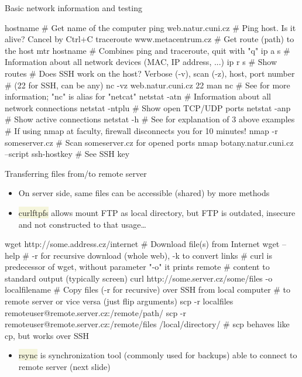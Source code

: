 \documentclass[compress, ucs, xelatex, 11pt, xcolor=svgnames, aspectratio=169,
	hyperref={
		bookmarks=true,
		unicode=true,
		colorlinks=true,
		pdftitle={Linux, command line and MetaCentrum},
		plainpages=false,
		pdfauthor={Vojtech Zeisek},
		pdfsubject={Course about use of Linux command line, writing shell scripts and using MetaCentrum of CESNET},
		pdfcreator={XeLaTeX},
		pdfkeywords={Linux, GNU, BASH, shell, command line, MetaCentrum},
		linkcolor=DarkRed, %
		anchorcolor=DarkBlue, %
		citecolor=Indigo, %
		filecolor=NavyBlue, %
		menucolor=DarkMagenta, %
		urlcolor=DarkBlue, %
		pdftex},
	url={hyphens, lowtilde} %
	]{beamer}
\renewcommand{\texttt}[1]{\colorbox{Beige}{{\ttfamily #1}}}
\begin{document}
\begin{frame}[fragile]{Basic network information and testing}
	\begin{bashcode}
    hostname # Get name of the computer
    ping web.natur.cuni.cz # Ping host. Is it alive? Cancel by Ctrl+C
    traceroute www.metacentrum.cz # Get route (path) to the host
    mtr hostname # Combines ping and traceroute, quit with "q"
    ip a s # Information about all network devices (MAC, IP address, ...)
    ip r s # Show routes
    # Does SSH work on the host? Verbose (-v), scan (-z), host, port number
    # (22 for SSH, can be any)
    nc -vz web.natur.cuni.cz 22
    man nc # See for more information; "nc" is alias for "netcat"
    netstat -atn # Information about all network connections
    netstat -ntplu # Show open TCP/UDP ports
    netstat -anp # Show active connections
    netstat -h # See for explanation of 3 above examples
    # If using nmap at faculty, firewall disconnects you for 10 minutes!
    nmap -r someserver.cz # Scan someserver.cz for opened ports
    nmap botany.natur.cuni.cz --script ssh-hostkey # See SSH key
	\end{bashcode}
\end{frame}

\begin{frame}[fragile]{Transferring files from/to remote server}
	\label{transfers}
	\begin{itemize}
		\item On server side, same files can be accessible (shared) by more methods
		\item \texttt{curlftpfs} allows mount FTP as local directory, but FTP is outdated, insecure and not constructed to that usage\ldots
	\end{itemize}
	\vfill
	\begin{bashcode}
    wget http://some.address.cz/internet # Download file(s) from Internet
    wget --help # -r for recursive download (whole web), -k to convert links
    # curl is predecessor of wget, without parameter "-o" it prints remote
    # content to standard output (typically screen)
    curl http://some.server.cz/some/files -o localfilename
    # Copy files (-r for recursive) over SSH from local computer
    # to remote server or vice versa (just flip arguments)
    scp -r localfiles remoteuser@remote.server.cz:/remote/path/
    scp -r remoteuser@remote.server.cz:/remote/files /local/directory/
    # scp behaves like cp, but works over SSH
	\end{bashcode}
	\vfill
	\begin{itemize}
		\item \texttt{rsync} is synchronization tool (commonly used for backups) able to connect to remote server (next slide)
	\end{itemize}
\end{frame}
\end{document}
